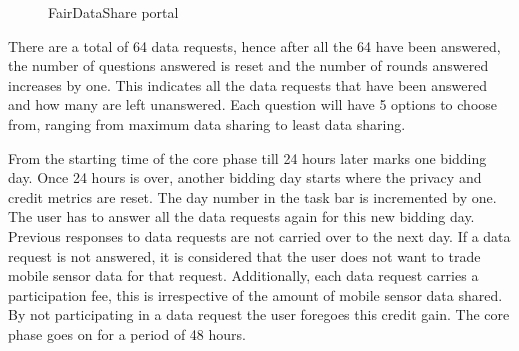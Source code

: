 \begin{figure}[htp]
  \hspace{1em}
  \caption{FairDataShare portal}
  \label{fig:bid}
\end{figure}


There are a total of 64 data requests, hence after all the 64 have been answered, the number of questions answered is reset and the number of rounds answered increases by one. This indicates all the data requests that have been answered and how many are left unanswered. Each question will have 5 options to choose from, ranging from maximum data sharing to least data sharing.

From the starting time of the core phase till 24 hours later marks one bidding day. Once 24 hours is over, another bidding day starts where the privacy and credit metrics are reset. The day number in the task bar is incremented by one. The user has to answer all the data requests again for this new bidding day. Previous responses to data requests are not carried over to the next day. If a data request is not answered, it is considered that the user does not want to trade mobile sensor data for that request. Additionally, each data request carries a participation fee, this is irrespective of the amount of mobile sensor data shared. By not participating in a data request the user foregoes this credit gain.
The core phase goes on for a period of 48 hours. 

